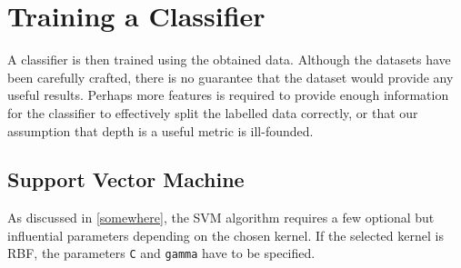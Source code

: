 \documentclass[dissertation.tex]{subfiles}
\begin{document}

\section{Training a Classifier}
A classifier is then trained using the obtained data. Although the datasets have been carefully crafted, there is no guarantee that the dataset would provide any useful results. Perhaps more features is required to provide enough information for the classifier to effectively split the labelled data correctly, or that our assumption that depth is a useful metric is ill-founded.

\subsection{Support Vector Machine}
As discussed in \ref{somewhere}, the SVM algorithm requires a few optional but influential parameters depending on the chosen kernel. If the selected kernel is RBF, the parameters \texttt{C} and \texttt{gamma} have to be specified.
\end{document}
